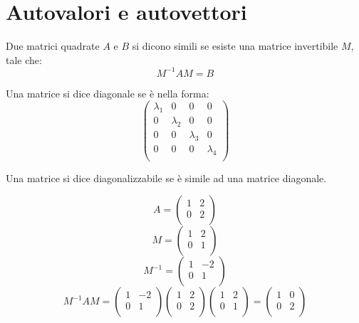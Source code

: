 \section{Autovalori e autovettori}

\begin{definition}
  Due matrici quadrate $A$ e $B$ si dicono simili se esiste una matrice invertibile $M$, tale che:
  $$M^{-1}AM=B$$
\end{definition}

\begin{definition}
  Una matrice si dice diagonale se è nella forma:
  $$
    \begin{pmatrix}
      \lambda_1 & 0         & 0         & 0         \\
      0         & \lambda_2 & 0         & 0         \\
      0         & 0         & \lambda_3 & 0         \\
      0         & 0         & 0         & \lambda_4 \\
    \end{pmatrix}
  $$
\end{definition}

\begin{definition}
  Una matrice si dice diagonalizzabile se è simile ad una matrice diagonale.
\end{definition}

\begin{example}
  $$
    A=
    \begin{pmatrix}
      1 & 2 \\
      0 & 2 \\
    \end{pmatrix}
  $$
  $$
    M=
    \begin{pmatrix}
      1 & 2 \\
      0 & 1 \\
    \end{pmatrix}
  $$
  $$
    M^{-1}=
    \begin{pmatrix}
      1 & -2 \\
      0 & 1  \\
    \end{pmatrix}
  $$
  $$
    M^{-1}AM=
    \begin{pmatrix}
      1 & -2 \\
      0 & 1  \\
    \end{pmatrix}
    \begin{pmatrix}
      1 & 2 \\
      0 & 2 \\
    \end{pmatrix}
    \begin{pmatrix}
      1 & 2 \\
      0 & 1 \\
    \end{pmatrix}
    =
    \begin{pmatrix}
      1 & 0 \\
      0 & 2 \\
    \end{pmatrix}
  $$
\end{example}

